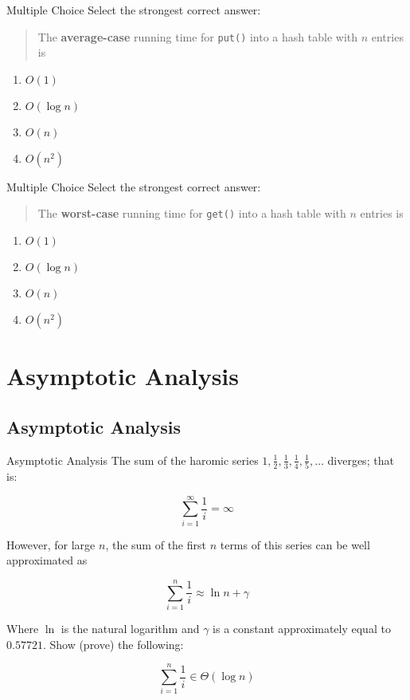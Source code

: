 \documentclass[9pt]{beamer}
\begin{document}
\begin{frame}[fragile]{Multiple Choice}
  Select the strongest correct answer:

  \begin{quote}
    The {\bf average-case} running time for {\tt put()} into a hash table
    with $n$ entries is
  \end{quote}

  \begin{enumerate}
    \item
      \alert<2>{$O(1)$}
    \item
      $O(\log{n})$
    \item
      $O(n)$
    \item
      $O(n^2)$
  \end{enumerate}
\end{frame}

\begin{frame}[fragile]{Multiple Choice}
  Select the strongest correct answer:

  \begin{quote}
    The {\bf worst-case} running time for {\tt get()} into a hash table
    with $n$ entries is
  \end{quote}

  \begin{enumerate}
    \item
      $O(1)$
    \item
      $O(\log{n})$
    \item
      \alert<2>{$O(n)$}
    \item
      $O(n^2)$
  \end{enumerate}
\end{frame}

\section{Asymptotic Analysis}
\subsection{Asymptotic Analysis}
\begin{frame}[fragile]{Asymptotic Analysis}
  The sum of the haromic series $1, \frac{1}{2}, \frac{1}{3}, \frac{1}{4},
  \frac{1}{5}, \dots$ diverges; that is:

  \[\sum_{i=1}^\infty \frac{1}{i} = \infty\]

  However, for large $n$, the sum of the first $n$ terms of this series can
  be well approximated as

  \[\sum_{i=1}^n \frac{1}{i} \approx \ln{n} + \gamma\]

  Where $\ln$ is the natural logarithm and $\gamma$ is a constant
  approximately equal to $0.57721$. Show (prove) the following:

  \[\sum_{i=1}^n \frac{1}{i} \in \Theta(\log{n})\]
\end{frame}
\end{document}
